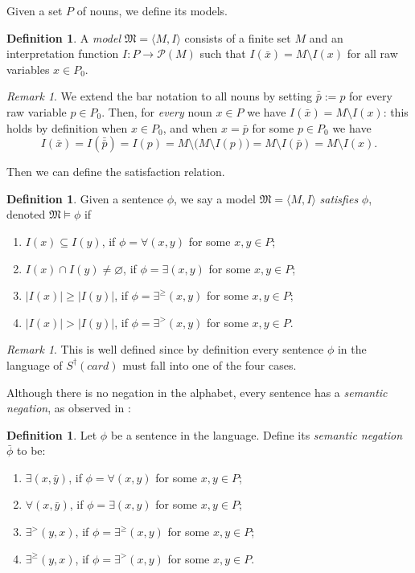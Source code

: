 \documentclass[12pt, reqno]{amsart}
\theoremstyle{definition}
\newtheorem{definition}[theorem]{Definition}
\theoremstyle{remark}
\newtheorem{remark}[theorem]{Remark}
\numberwithin{equation}{section}
\begin{document}
Given a set $P$ of nouns, we define its models. 
\begin{definition}
A \textit{model} $\mathfrak{M} = \langle M, I\rangle$ consists of a finite set $M$ and an interpretation function $I : P \to \mathcal{P}(M)$ such that $I(\bar{x}) = M \setminus I(x)$ for all raw variables $x \in P_0$. 
\end{definition}

\begin{remark}\label{bar_involution}
We extend the bar notation to all nouns by setting $\bar{\bar{p}} \mathrel{:=} p$ for
every raw variable $p \in P_0$. Then, for \emph{every} noun $x \in P$ we have
$I(\bar{x}) = M \setminus I(x)$: this holds by definition when $x \in P_0$, and
when $x = \bar{p}$ for some $p \in P_0$ we have
\[
I(\bar{x}) = I(\bar{\bar{p}}) = I(p) = M \setminus \bigl(M \setminus I(p)\bigr)
= M \setminus I(\bar{p}) = M \setminus I(x).
\]
\end{remark}

Then we can define the satisfaction relation. 

\begin{definition}
Given a sentence $\phi$, we say a model $\mathfrak{M} = \langle M, I\rangle$ \textit{satisfies} $\phi$, denoted $\mathfrak{M}  \models \phi$ if 
\begin{enumerate} 
\item $I(x) \subseteq I(y)$, if $\phi = \forall(x, y)$ for some $x, y \in P$;
\item $I(x) \cap I(y) \neq \varnothing$,  if $\phi = \exists(x, y)$ for some $x, y \in P$;
\item $|I(x)| \geq |I(y)|$,  if $\phi = \exists^{\geq}(x, y)$ for some $x, y \in P$;
\item $|I(x)| > |I(y)|$,  if $\phi = \exists^{>}(x, y)$ for some $x, y \in P$. 
\end{enumerate}
\end{definition}

\begin{remark}
This is well defined since by definition every sentence $\phi$ in the language of $S^{\dagger}(card)$ must fall into one of the four cases. 
\end{remark}

Although there is no negation in the alphabet, every sentence has a \textit{semantic
negation}, as observed in \cite{Larry}:

\begin{definition}\label{sem_neg_def}
	Let $\phi$ be a sentence in the language. Define its \textit{semantic negation} $\bar{\phi}$ to be: 
	\begin{enumerate} 
	\item $\exists(x, \bar{y})$, if $\phi = \forall(x, y)$ for some $x, y \in P$;
	\item $\forall(x, \bar{y})$,  if $\phi = \exists(x, y)$ for some $x, y \in P$;
	\item $\exists^{>}(y, x)$,  if $\phi = \exists^{\geq}(x, y)$ for some $x, y \in P$;
	\item $\exists^{\geq}(y, x)$,  if $\phi = \exists^{>}(x, y)$ for some $x, y \in P$. 
\end{enumerate}
\end{definition}
\end{document}
